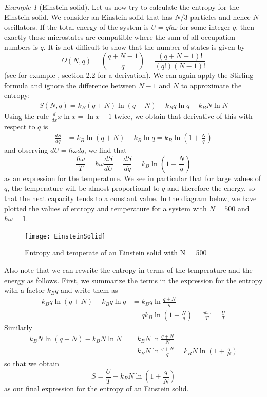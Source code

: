 \documentclass[a4paper, draft]{article}
\theoremstyle{own}
\theoremstyle{remark}
\newtheorem{example}{Example}[section]
\begin{document}
\begin{example}[Einstein solid]
Let us now try to calculate the entropy for the Einstein solid. We consider an Einstein solid that has $N/3$ particles and hence $N$ oscillators. If the total energy of the system is $U = q\hbar \omega$ for some integer $q$, then exactly those microstates are compatible where the sum of all occupation numbers is $q$. It is not difficult to show that the number of states is given by
$$
\Omega(N,q) = {\binom{q + N -1}{q}} = \frac{(q+N-1)!}{(q!)(N-1)!}
$$
(see for example \cite{Schroeder}, section 2.2 for a derivation). We can again apply the Stirling formula  and ignore the difference between $N-1$ and $N$ to approximate the entropy:
\begin{align*}
S(N,q) = k_B (q+ N) \ln (q + N) - k_B q \ln q - k_B N \ln N  
\end{align*}
Using the rule $\frac{d}{dx} x \ln x = \ln x + 1$ twice, we obtain that derivative of this with respect to $q$ is
\begin{align*}
\frac{dS}{dq} &= k_B \ln (q + N) - k_B \ln q  = k_B \ln (1 + \frac{N}{q})
\end{align*}
and observing $dU = \hbar \omega dq$, we find that
$$
\frac{\hbar \omega}{T} = \hbar \omega \frac{dS}{dU} = \frac{dS}{dq} =  k_B \ln (1 + \frac{N}{q})
$$
as an expression for the temperature. 
We see in particular that for large values of $q$, the temperature will be almost proportional to $q$ and therefore the energy, so that the heat capacity tends to a constant value. In the diagram below, we have plotted the values of entropy and temperature for a system with $N = 500$ and $\hbar \omega = 1$. 

\begin{figure}[ht]
\centering
\texttt{[image: EinsteinSolid]}
\caption{Entropy and temperate of an Einstein solid with N = 500}
\label{fig:EinsteinSolid}
\end{figure}

Also note that we can rewrite the entropy in terms of the temperature and the energy as follows. First, we summarize the terms in the expression for the entropy with a factor $k_B q$ and write them as
\begin{align*}
k_B q \ln (q + N) - k_B q \ln q &= k_B q \ln \frac{q + N}{q} \\
&= q k_B \ln (1 + \frac{N}{q}) = \frac{q\hbar \omega}{T} = \frac{U}{T}
\end{align*}
Similarly
\begin{align*}
k_B N \ln (q + N) -  k_B N \ln N  	&= k_B N \ln \frac{q + N}{N} \\
&= k_B N \ln  \frac{q + N}{q} = k_B N \ln (1 + \frac{q}{N}) 
\end{align*}
so that we obtain 
$$
S = \frac{U}{T} + k_B N \ln (1 + \frac{q}{N}) 
$$
as our final expression for the entropy of an Einstein solid.
\end{example}
\end{document}
